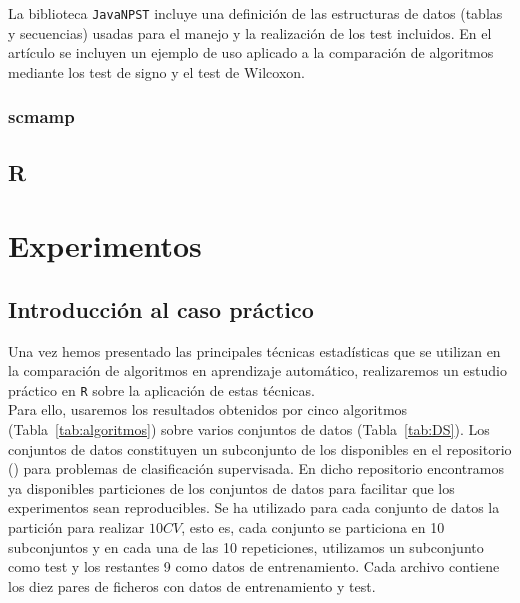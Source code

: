 	La biblioteca \texttt{JavaNPST} incluye una definición de 
las estructuras de datos (tablas y secuencias) usadas para 
el manejo y la realización de los test incluidos. En el 
artículo se incluyen un ejemplo de uso aplicado a la 
comparación de algoritmos mediante los test de 
signo y el test de Wilcoxon. 

\subsection*{scmamp} 

	
	
	
	 
\section{R}

\chapter{Experimentos}
\label{chapter:experimentos}
\section{Introducción al caso práctico}
	Una vez hemos presentado las principales técnicas
estadísticas que se utilizan en la comparación de algoritmos
en aprendizaje automático, realizaremos un estudio práctico
en \texttt{R} sobre la aplicación de estas técnicas.\\
	Para ello, usaremos los resultados obtenidos por cinco
algoritmos (Tabla~\ref{tab:algoritmos}) 
sobre varios conjuntos de datos (Tabla~\ref{tab:DS}). Los
conjuntos de datos constituyen un subconjunto de los 
disponibles en el repositorio 
(\cite{alcala2010keel}) para problemas de clasificación
supervisada. En dicho repositorio encontramos ya disponibles
particiones de los conjuntos de datos para facilitar que los
experimentos sean reproducibles. Se ha utilizado para cada 
conjunto de datos la partición para realizar $10CV$, esto es,
cada conjunto se particiona en 10 subconjuntos y en cada una 
de las 10 repeticiones, utilizamos un subconjunto como test y
los restantes 9 como datos de entrenamiento. Cada archivo
contiene los diez pares de ficheros con datos de
entrenamiento y test.

